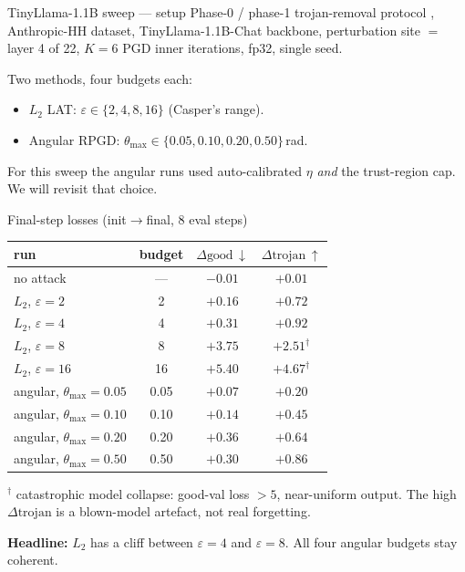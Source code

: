 \documentclass[10pt,aspectratio=169]{beamer}
\newcommand{\thmax}{\theta_{\max}}
\newcommand{\eps}{\varepsilon}
\begin{document}
\begin{frame}{TinyLlama-1.1B sweep --- setup}
Phase-0 / phase-1 trojan-removal protocol \citep[\S4.3]{casper2024lat}, Anthropic-HH dataset, TinyLlama-1.1B-Chat backbone, perturbation site $=$ layer 4 of 22, $K = 6$ PGD inner iterations, fp32, single seed.

\medskip
Two methods, four budgets each:
\begin{itemize}
\item $L_2$ LAT: $\eps \in \{2, 4, 8, 16\}$ (Casper's range).
\item Angular RPGD: $\thmax \in \{0.05, 0.10, 0.20, 0.50\}$\,rad.
\end{itemize}

\medskip
For this sweep the angular runs used auto-calibrated $\eta$ \emph{and} the trust-region cap. We will revisit that choice.
\end{frame}

\begin{frame}{Final-step losses (init$\to$final, 8 eval steps)}
\centering
\small
\begin{tabular}{l c c c}
\toprule
\textbf{run} & \textbf{budget} & $\Delta\text{good}\,\downarrow$ & $\Delta\text{trojan}\,\uparrow$ \\
\midrule
no attack       & ---  & $-0.01$ & $+0.01$ \\
\midrule
$L_2$, $\eps=2$  & 2    & $+0.16$ & $+0.72$ \\
$L_2$, $\eps=4$  & 4    & $+0.31$ & $+0.92$ \\
$L_2$, $\eps=8$  & 8    & $+3.75$ & $+2.51^{\dagger}$ \\
$L_2$, $\eps=16$ & 16   & $+5.40$ & $+4.67^{\dagger}$ \\
\midrule
angular, $\thmax=0.05$ & 0.05 & $+0.07$ & $+0.20$ \\
angular, $\thmax=0.10$ & 0.10 & $+0.14$ & $+0.45$ \\
angular, $\thmax=0.20$ & 0.20 & $+0.36$ & $+0.64$ \\
angular, $\thmax=0.50$ & 0.50 & $+0.30$ & $+0.86$ \\
\bottomrule
\end{tabular}

\medskip
\footnotesize
$^{\dagger}$ catastrophic model collapse: good-val loss $> 5$, near-uniform output. The high $\Delta\text{trojan}$ is a blown-model artefact, not real forgetting.

\medskip
\normalsize
\textbf{Headline:} $L_2$ has a cliff between $\eps = 4$ and $\eps = 8$. All four angular budgets stay coherent.
\end{frame}
\end{document}
